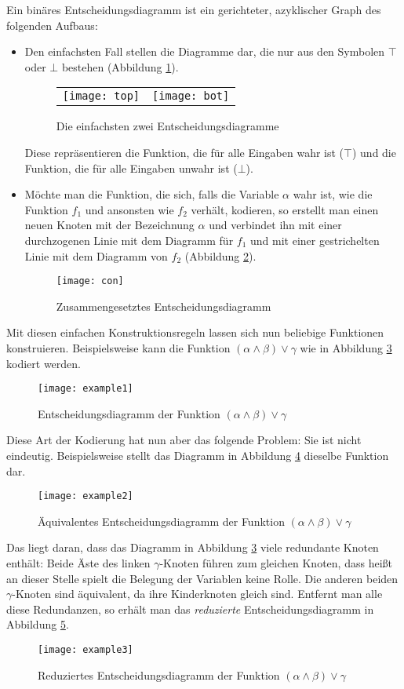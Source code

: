 Ein binäres Entscheidungsdiagramm ist ein gerichteter, azyklischer Graph des folgenden Aufbaus:
\begin{itemize}
\item Den einfachsten Fall stellen die Diagramme dar, die nur aus den Symbolen $\top$ oder $\bot$ bestehen (Abbildung \ref{fig:easy_bdd}).
  \begin{figure}[!h]
    \centering
    \begin{tabular}{cc}
      \texttt{[image: top]} & \texttt{[image: bot]}
    \end{tabular}
    \caption{Die einfachsten zwei Entscheidungsdiagramme}
    \label{fig:easy_bdd}
  \end{figure}
  Diese repräsentieren die Funktion, die für alle Eingaben wahr ist ($\top$) und die Funktion, die für alle Eingaben unwahr ist ($\bot$).
\item Möchte man die Funktion, die sich, falls die Variable $\alpha$ wahr ist, wie die Funktion $f_1$ und ansonsten wie $f_2$ verhält, kodieren, so erstellt man einen neuen Knoten mit der Bezeichnung $\alpha$ und verbindet ihn mit einer durchzogenen Linie mit dem Diagramm für $f_1$ und mit einer gestrichelten Linie mit dem Diagramm von $f_2$ (Abbildung \ref{fig:con_bdd}).
  \begin{figure}[!h]
    \centering
    \texttt{[image: con]}
    \caption{Zusammengesetztes Entscheidungsdiagramm}
    \label{fig:con_bdd}
  \end{figure}
\end{itemize}
Mit diesen einfachen Konstruktionsregeln lassen sich nun beliebige Funktionen konstruieren.
Beispielsweise kann die Funktion $(\alpha\land\beta)\lor \gamma$ wie in Abbildung \ref{fig:example1_bdd} kodiert werden.
\begin{figure}[h]
  \centering
  \texttt{[image: example1]}
  \caption{Entscheidungsdiagramm der Funktion $(\alpha\land\beta)\lor \gamma$}
  \label{fig:example1_bdd}
\end{figure}
Diese Art der Kodierung hat nun aber das folgende Problem: Sie ist nicht eindeutig.
Beispielsweise stellt das Diagramm in Abbildung \ref{fig:example2_bdd} dieselbe Funktion dar.
\begin{figure}[h]
  \centering
  \texttt{[image: example2]}
  \caption{Äquivalentes Entscheidungsdiagramm der Funktion $(\alpha\land\beta)\lor \gamma$}
  \label{fig:example2_bdd}
\end{figure}
Das liegt daran, dass das Diagramm in Abbildung \ref{fig:example1_bdd} viele redundante Knoten enthält:
Beide Äste des linken $\gamma$-Knoten führen zum gleichen Knoten, dass heißt an dieser Stelle spielt die Belegung der Variablen keine Rolle.
Die anderen beiden $\gamma$-Knoten sind äquivalent, da ihre Kinderknoten gleich sind.
Entfernt man alle diese Redundanzen, so erhält man das \emph{reduzierte} Entscheidungsdiagramm in Abbildung \ref{fig:example3_bdd}.
\begin{figure}[h]
  \centering
  \texttt{[image: example3]}
  \caption{Reduziertes Entscheidungsdiagramm der Funktion $(\alpha\land\beta)\lor \gamma$}
  \label{fig:example3_bdd}
\end{figure}

